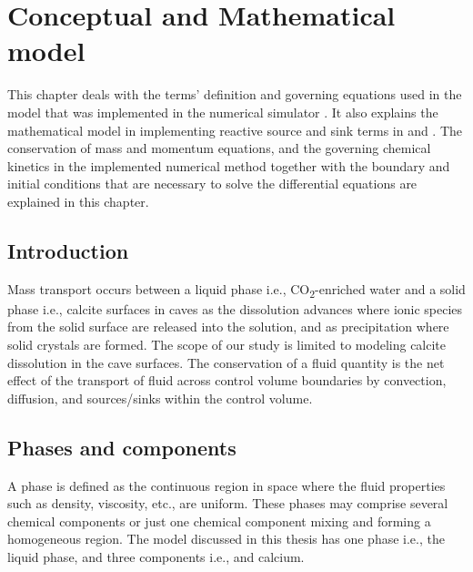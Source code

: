 \chapter{Conceptual and Mathematical model}\label{chapter:conceptualmodel}
\thispagestyle{empty}

This chapter deals with the terms' definition and governing equations used in the model that was 
implemented in the numerical simulator \DuMuX. It also explains the mathematical model 
in implementing reactive source and sink terms in \DuMuX and \MATLAB. The conservation of mass and momentum equations, 
and the governing chemical kinetics in the implemented numerical method together with the boundary 
and initial conditions that are necessary to solve the differential equations are explained in this chapter. 

\section{Introduction}
Mass transport occurs between a liquid phase i.e., CO\textsubscript{2}-enriched water and a solid phase 
i.e., calcite surfaces in caves as the dissolution advances where ionic species from the solid surface are 
released into the solution, and as precipitation where solid crystals are formed. The scope of our study 
is limited to modeling calcite dissolution in the cave surfaces. The conservation of a 
fluid quantity is the net effect of the transport of fluid across control volume boundaries by convection, 
diffusion, and sources/sinks within the control volume.
 
\section{Phases and components}
A phase is defined as the continuous region in space where the fluid properties such as density, viscosity, etc., are uniform. 
These phases may comprise several chemical components or just one chemical component mixing and forming a homogeneous region. 
The model discussed in this thesis has one phase i.e., the liquid phase, and three components i.e.,  and calcium.

